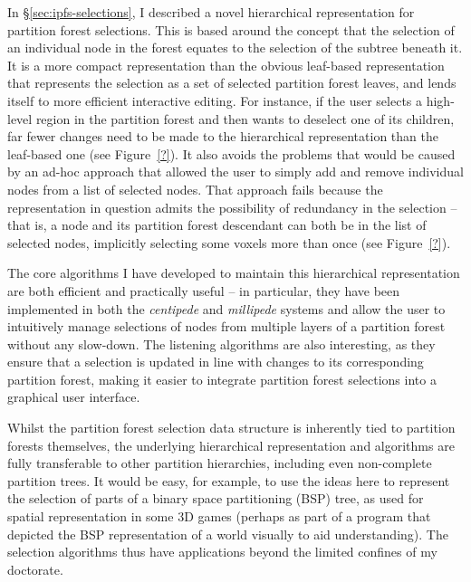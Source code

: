 In \S\ref{sec:ipfs-selections}, I described a novel hierarchical representation for partition forest selections. This is based around the concept that the selection of an individual node in the forest equates to the selection of the subtree beneath it. It is a more compact representation than the obvious leaf-based representation that represents the selection as a set of selected partition forest leaves, and lends itself to more efficient interactive editing. For instance, if the user selects a high-level region in the partition forest and then wants to deselect one of its children, far fewer changes need to be made to the hierarchical representation than the leaf-based one (see Figure~\ref{?}). It also avoids the problems that would be caused by an ad-hoc approach that allowed the user to simply add and remove individual nodes from a list of selected nodes. That approach fails because the representation in question admits the possibility of redundancy in the selection -- that is, a node and its partition forest descendant can both be in the list of selected nodes, implicitly selecting some voxels more than once (see Figure~\ref{?}).

The core algorithms I have developed to maintain this hierarchical representation are both efficient and practically useful -- in particular, they have been implemented in both the \emph{centipede} and \emph{millipede} systems and allow the user to intuitively manage selections of nodes from multiple layers of a partition forest without any slow-down. The listening algorithms are also interesting, as they ensure that a selection is updated in line with changes to its corresponding partition forest, making it easier to integrate partition forest selections into a graphical user interface.

Whilst the partition forest selection data structure is inherently tied to partition forests themselves, the underlying hierarchical representation and algorithms are fully transferable to other partition hierarchies, including even non-complete partition trees. It would be easy, for example, to use the ideas here to represent the selection of parts of a binary space partitioning (BSP) tree, as used for spatial representation in some 3D games (perhaps as part of a program that depicted the BSP representation of a world visually to aid understanding). The selection algorithms thus have applications beyond the limited confines of my doctorate.

\iffalse
+ Usefulness well-justified
+ Algorithms carefully pinned down, reasonable complexities
+ No comparison in the literature
+ Can be reused for feature marking
\fi

